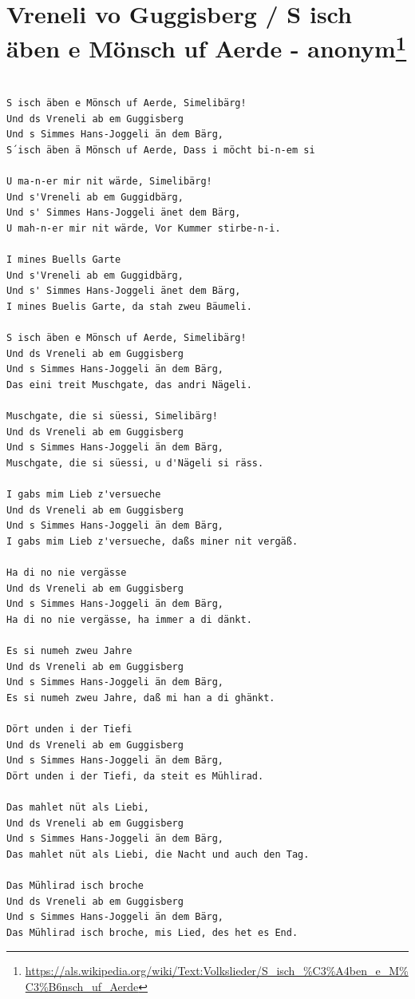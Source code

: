\documentclass[
]{book}
\let\stdsection\section
\renewcommand\section{\clearpage\stdsection}
\begin{document}
\hypertarget{volsklieder-guggisberg}{%
\section[Vreneli vo Guggisberg / S isch äben e Mönsch uf Aerde - anonym]{\texorpdfstring{Vreneli vo Guggisberg / S isch äben e Mönsch uf Aerde - anonym\footnote{\url{https://als.wikipedia.org/wiki/Text:Volkslieder/S_isch_\%C3\%A4ben_e_M\%C3\%B6nsch_uf_Aerde}}}{Vreneli vo Guggisberg / S isch äben e Mönsch uf Aerde - anonym}}\label{volsklieder-guggisberg}}

\begin{verbatim}

S isch äben e Mönsch uf Aerde, Simelibärg!
Und ds Vreneli ab em Guggisberg
Und s Simmes Hans-Joggeli än dem Bärg,
S´isch äben ä Mönsch uf Aerde, Dass i möcht bi-n-em si

U ma-n-er mir nit wärde, Simelibärg!
Und s'Vreneli ab em Guggidbärg,
Und s' Simmes Hans-Joggeli änet dem Bärg,
U mah-n-er mir nit wärde, Vor Kummer stirbe-n-i.

I mines Buells Garte
Und s'Vreneli ab em Guggidbärg,
Und s' Simmes Hans-Joggeli änet dem Bärg,
I mines Buelis Garte, da stah zweu Bäumeli.

S isch äben e Mönsch uf Aerde, Simelibärg!
Und ds Vreneli ab em Guggisberg
Und s Simmes Hans-Joggeli än dem Bärg,
Das eini treit Muschgate, das andri Nägeli.

Muschgate, die si süessi, Simelibärg!
Und ds Vreneli ab em Guggisberg
Und s Simmes Hans-Joggeli än dem Bärg,
Muschgate, die si süessi, u d'Nägeli si räss.

I gabs mim Lieb z'versueche
Und ds Vreneli ab em Guggisberg
Und s Simmes Hans-Joggeli än dem Bärg,
I gabs mim Lieb z'versueche, daßs miner nit vergäß.

Ha di no nie vergässe
Und ds Vreneli ab em Guggisberg
Und s Simmes Hans-Joggeli än dem Bärg,
Ha di no nie vergässe, ha immer a di dänkt.

Es si numeh zweu Jahre
Und ds Vreneli ab em Guggisberg
Und s Simmes Hans-Joggeli än dem Bärg,
Es si numeh zweu Jahre, daß mi han a di ghänkt.

Dört unden i der Tiefi
Und ds Vreneli ab em Guggisberg
Und s Simmes Hans-Joggeli än dem Bärg,
Dört unden i der Tiefi, da steit es Mühlirad.

Das mahlet nüt als Liebi,
Und ds Vreneli ab em Guggisberg
Und s Simmes Hans-Joggeli än dem Bärg,
Das mahlet nüt als Liebi, die Nacht und auch den Tag.

Das Mühlirad isch broche
Und ds Vreneli ab em Guggisberg
Und s Simmes Hans-Joggeli än dem Bärg,
Das Mühlirad isch broche, mis Lied, des het es End.
\end{verbatim}
\end{document}
